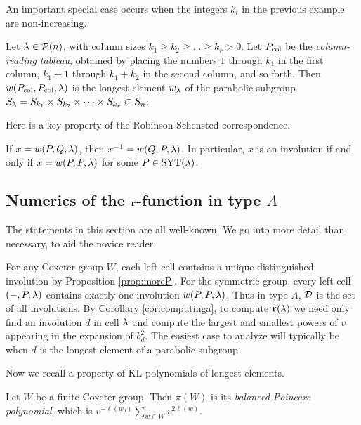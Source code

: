 An important special case occurs when the integers $k_i$ in the previous example are non-increasing.

\begin{ex} \label{ex:columnreading} Let $\lambda \in {\mathcal{P}}(n)$, with column sizes $k_1 \ge k_2 \ge \ldots \ge k_r > 0$. Let $P_{\operatorname{col}}$ be the \emph{column-reading tableau}, obtained by placing
the numbers $1$ through $k_1$ in the first column, $k_1 + 1$ through $k_1 + k_2$ in the second column, and so forth. Then $w(P_{\operatorname{col}},P_{\operatorname{col}},\lambda)$ is the longest element $w_{\lambda}$ of the
parabolic subgroup $S_\lambda = S_{k_1} \times S_{k_2} \times \cdots \times S_{k_r} \subset S_n$. \end{ex}

Here is a key property of the Robinson-Schensted correspondence.
	
\begin{prop} \label{prop:involution} If $x = w(P,Q,\lambda)$, then $x^{-1} = w(Q,P,\lambda)$. In particular, $x$ is an involution if and only if $x = w(P,P,\lambda)$ for some $P \in \operatorname{SYT}(\lambda)$. \end{prop}


\subsection{Numerics of the $\mathbf{r}$-function in type $A$}
\label{subsec:longestnumerics}

The statements in this section are all well-known. We go into more detail than necessary, to aid the novice reader.

For any Coxeter group $W$, each left cell contains a unique distinguished involution by Proposition \ref{prop:moreP}. For the symmetric group, every left cell $(-,P,\lambda)$ contains exactly
one involution $w(P,P,\lambda)$. Thus in type $A$, ${\mathcal{D}}$ is the set of all involutions. By Corollary \ref{cor:computinga}, to compute $\mathbf{r}(\lambda)$ we need only find an involution $d$ in cell $\lambda$
and compute the largest and smallest powers of $v$ appearing in the expansion of $b_d^2$. The easiest case to analyze will typically be when $d$ is the longest element of a parabolic
subgroup.

Now we recall a property of KL polynomials of longest elements.

\begin{defn} Let $W$ be a finite Coxeter group. Then $\pi(W)$ is its \emph{balanced Poincare polynomial}, which is $v^{-\ell(w_0)} \sum_{w \in W} v^{2 \ell(w)}$. \end{defn}
	
